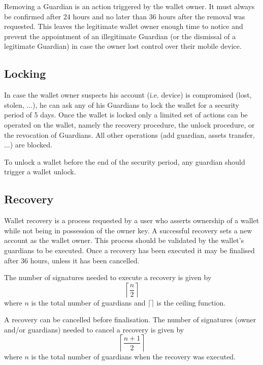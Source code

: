 \documentclass[12pt]{article}
\begin{document}
Removing a Guardian is an action triggered by the wallet owner. It must always be confirmed after 24 hours and no later than 36 hours after the removal was requested. This leaves the legitimate wallet owner enough time to notice and prevent the appointment of an illegitimate Guardian (or the dismissal of a legitimate Guardian) in case the owner lost control over their mobile device.

\subsection{Locking}

In case the wallet owner suspects his account (i.e. device) is compromised (lost, stolen, ...), he can ask any of his Guardians to lock the wallet for a security period of 5 days. Once the wallet is locked only a limited set of actions can be operated on the wallet, namely the recovery procedure, the unlock procedure, or the revocation of Guardians. All other operations (add guardian, assets transfer, ...) are blocked.

To unlock a wallet before the end of the security period, any guardian should trigger a wallet unlock.

\subsection{Recovery}

Wallet recovery is a process requested by a user who asserts ownership of a wallet while not being in possession of the owner key. A successful recovery sets a new account as the wallet owner. This process should be validated by the wallet's guardians to be executed. Once a recovery has been executed it may be finalised after 36 hours, unless it has been cancelled.

The number of signatures needed to execute a recovery is given by
\begin{equation*}
    \left\lceil {\frac{n}{2}} \right\rceil
\end{equation*}
where $n$ is the total number of guardians and $\lceil\rceil$ is the ceiling function.

A recovery can be cancelled before finalisation. The number of signatures (owner and/or guardians) needed to cancel a recovery is given by
\begin{equation*}
    \left\lceil {\frac{n+1}{2}} \right\rceil
\end{equation*}
where $n$ is the total number of guardians when the recovery was executed.
\end{document}
